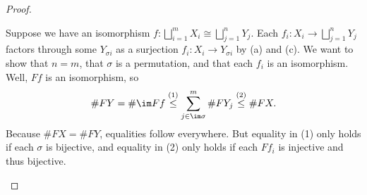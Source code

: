 \documentclass{amsart}
\begin{document}
\begin{proof}
\begin{listalph}
        \item Suppose we have an isomorphism $f\colon\bigsqcup_{i=1}^mX_i\cong\bigsqcup_{j=1}^nY_j$. Each $f_i\colon X_i\to\bigsqcup_{j=1}^nY_j$ factors through some $Y_{\sigma i}$ as a surjection $f_i\colon X_i\to Y_{\sigma i}$ by (a) and (c). We want to show that $n=m$, that $\sigma$ is a permutation, and that each $f_i$ is an isomorphism. Well, $Ff$ is an isomorphism, so
        \[\#FY=\#\im Ff\stackrel{(1)}\le\sum_{j\in\im\sigma}^m\#FY_j\stackrel{(2)}\le\#FX.\]
        Because $\#FX=\#FY$, equalities follow everywhere. But equality in (1) only holds if each $\sigma$ is bijective, and equality in (2) only holds if each $Ff_i$ is injective and thus bijective.
        \qedhere
    \end{listalph}
\end{proof}
\end{document}
